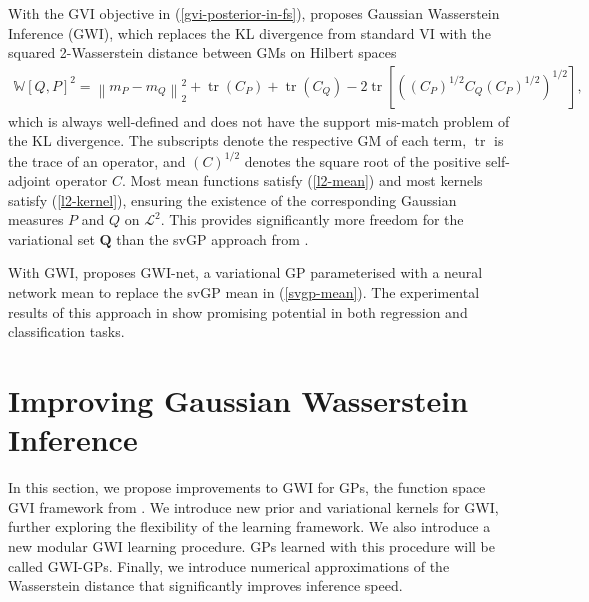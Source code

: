 \documentclass{article}
\newcommand{\tr}{\operatorname{tr}}
\numberwithin{equation}{section}
\begin{document}
With the GVI objective in (\ref{gvi-posterior-in-fs}), \cite{wild2022generalized} proposes Gaussian Wasserstein Inference (GWI), which replaces the KL divergence from standard VI with the squared 2-Wasserstein distance between GMs on Hilbert spaces 
\begin{align}
    \mathbb{W}\left[Q, P\right]^2 = \left\|m_P - m_Q\right\|_2^2 + \tr\left(C_P\right) + \tr\left(C_Q\right) - 2 \tr \left[\left(\left(C_P\right)^{1/2} C_Q \left(C_P\right)^{1/2} \right)^{1/2}\right],
    \label{wasserstein-distance}
\end{align}
which is always well-defined and does not have the support mis-match problem of the KL divergence.
The subscripts denote the respective GM of each term, $\tr$ is the trace of an operator, and $(C)^{1/2}$ denotes the square root of the positive self-adjoint operator $C$.
Most mean functions satisfy (\ref{l2-mean}) and most kernels satisfy (\ref{l2-kernel}), ensuring the existence of the corresponding Gaussian measures $P$ and $Q$ on $\mathcal{L}^2$.
This provides significantly more freedom for the variational set $\boldsymbol{Q}$ than the svGP approach from \cite{titsias2009variational}.

With GWI, \cite{wild2022generalized} proposes GWI-net, a variational GP parameterised with a neural network mean to replace the svGP mean in (\ref{svgp-mean}).
The experimental results of this approach in \cite{wild2022generalized} show promising potential in both regression and classification tasks.

\newpage

\section{Improving Gaussian Wasserstein Inference}\label{section:improving-gwi}
In this section, we propose improvements to GWI for GPs, the function space GVI framework from \cite{wild2022generalized}.
We introduce new prior and variational kernels for GWI, further exploring the flexibility of the learning framework.
We also introduce a new modular GWI learning procedure.
GPs learned with this procedure will be called GWI-GPs.
Finally, we introduce numerical approximations of the Wasserstein distance that significantly improves inference speed.
\end{document}
